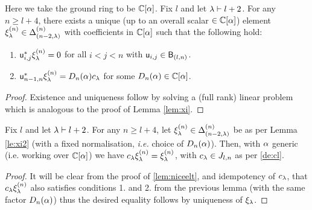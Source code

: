 \begin{lemma}\label{le:xi2}
Here we take the ground ring to be $\mathbb{C}[\alpha]$. %
    Fix $l$ and let $\lambda\vdash l+2$. For any $n\geq l+4$, there exists a unique (up to an overall scalar $\in \mathbb{C}[\alpha]$) element $\xi^{(n)}_\lambda\in \Delta^{(n)}_{(n-2,\lambda)}$ with coefficients in $\mathbb{C}[\alpha]$ 
    such that the following hold:
    \begin{enumerate}
        \item ${\mathsf u}^*_{i,j} \xi^{(n)}_{\lambda}=0$ for all $i<j<n$ with ${\mathsf u}_{i,j}\in {\mathsf B}_{(l,n)}$.
        \item ${\mathsf u}^*_{n-1,n} \xi^{(n)}_{\lambda}=D_n(\alpha) c_\lambda $ for some $D_n(\alpha)\in \mathbb{C}[\alpha]$.  
    \end{enumerate}
\end{lemma}
\begin{proof}
    Existence and uniqueness follow by solving a (full rank) linear problem which is analogous to the proof of Lemma \ref{lem:xi}. 
\end{proof}
\begin{lemma}\label{lem:cxi} Fix $l$ and let $\lambda\vdash l+2$. For any $n\geq l+4$, let $\xi^{(n)}_\lambda\in \Delta^{(n)}_{(n-2,\lambda)}$ be as per Lemma \ref{le:xi2} (with a fixed normalisation, \textit{i.e.} choice of $D_n(\alpha)$). Then, with $\alpha$ generic (i.e. working over $\mathbb{C}[\alpha]$) we have $c_\lambda  \xi^{(n)}_\lambda=\xi^{(n)}_\lambda$, with $c_\lambda\in J_{l,n}$ as per \ref{de:cl}.   
\end{lemma}
\begin{proof} 
It will be clear from the proof of \ref{lem:niceelt}, and idempotency of $c_\lambda$, that $c_\lambda  \xi^{(n)}_\lambda$ also satisfies conditions 1. and 2. from the previous lemma (with the same factor $D_n(\alpha)$) thus the desired equality follows by uniqueness of $\xi_\lambda$.
\end{proof}

